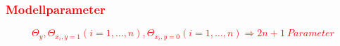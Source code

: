 			\subsubsection*{\textcolor{red}{Modellparameter}}
				
				\textcolor{red}{\[ \Theta_y, \Theta_{x_i,y = 1} (i=1,\dots,n), \Theta_{x_i,y = 0} (i=1,\dots,n)  \Rightarrow 2n + 1 \medspace Parameter\]}
			
			
